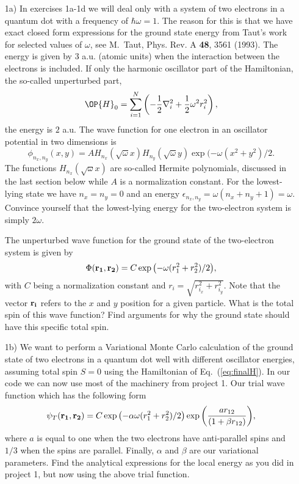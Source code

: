 \documentclass[10pt]{article}
\begin{document}
\begin{enumerate}

\item[1a)]  In exercises 1a-1d we will deal only with a system of 
two electrons in a quantum dot with a frequency of $\hbar\omega = 1$. 
The reason for this is that we have exact closed form expressions 
for the ground state energy from Taut's work for selected values of $\omega$, 
see M.~Taut, Phys. Rev. A {\bf 48}, 3561 (1993).
The energy is given by $3$ a.u.  (atomic units) when the interaction between the electrons is included.
If only the harmonic oscillator part of the Hamiltonian,
the so-called unperturbed part,
\[ \OP{H}_0=\sum_{i=1}^{N} \left(  -\frac{1}{2} \nabla_i^2 + \frac{1}{2} \omega^2r_i^2  \right),\]
the energy is $2$ a.u.
The wave function for one electron in an oscillator potential in two dimensions is
\[
\phi_{n_x,n_y}(x,y) = A H_{n_x}(\sqrt{\omega}x)H_{n_y}(\sqrt{\omega}y)\exp{(-\omega(x^2+y^2)/2}.
\]
The functions $H_{n_x}(\sqrt{\omega}x)$ are so-called Hermite polynomials, discussed in the last section below  while $A$ is a normalization constant. 
For the lowest-lying state we have $n_x=n_y=0$ and an energy $\epsilon_{n_x,n_y}=\omega(n_x+n_y+1) = \omega$.
Convince yourself that the lowest-lying energy for the two-electron system  is simply $2\omega$.

The unperturbed wave function for the ground state of the two-electron system is given by 
\[
\Phi({\bf r_1},{\bf r_2}) = C\exp{\left(-\omega(r_1^2+r_2^2)/2\right)},
\]
with $C$ being a normalization constant and $r_i = \sqrt{r_{i_x}^2+r_{i_y}^2}$. Note that the vector ${\bf r_i}$ 
refers to the $x$ and $y$ position for a given particle.
What is the total spin of this wave function? Find arguments for why the ground state should have
this specific total spin. 

\item[1b)] We want to perform  a Variational Monte Carlo calculation of the ground state of two electrons in a quantum dot well with different oscillator energies, assuming total spin $S=0$ using the Hamiltonian of 
Eq.~(\ref{eq:finalH}). 
In our code we can now use most of the machinery from project 1. 
Our trial wave function which has the following form
\begin{equation}
   \psi_{T}({\bf r_1},{\bf r_2}) = 
   C\exp{\left(-\alpha\omega(r_1^2+r_2^2)/2\right)}
   \exp{\left(\frac{ar_{12}}{(1+\beta r_{12})}\right)}, 
\label{eq:trial}
\end{equation}
where $a$ is equal to one when the two electrons have anti-parallel spins and $1/3$ when the spins are parallel. Finally, $\alpha$ and $\beta$ are our variational parameters.
Find the analytical expressions for the local energy as you did in project 1, but now using the above trial function.


\end{enumerate}
\end{document}
